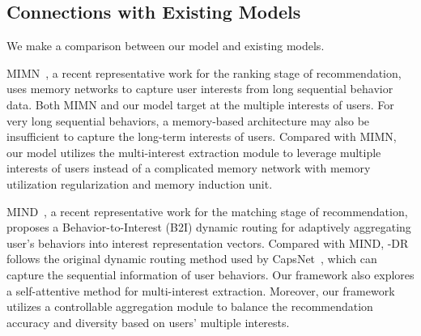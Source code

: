 \subsection{Connections with Existing Models}
We make a comparison between our model and existing models. 

MIMN~\cite{pi2019practice}, a recent representative work for the ranking stage of recommendation, uses memory networks to capture user interests from long sequential behavior data. Both MIMN and our model target at the multiple interests of users. For very long sequential behaviors, a memory-based architecture may also be insufficient to capture the long-term interests of users. Compared with MIMN, our model utilizes the multi-interest extraction module to leverage multiple interests of users instead of a complicated memory network with memory utilization regularization and memory induction unit. 

MIND~\cite{li2019multi}, a recent representative work for the matching stage of recommendation, proposes a Behavior-to-Interest (B2I) dynamic routing for adaptively aggregating user's behaviors into interest representation vectors. Compared with MIND, \model-DR follows the original dynamic routing method used by CapsNet~\cite{sabour2017dynamic}, which can capture the sequential information of user behaviors. Our framework also explores a self-attentive method for multi-interest extraction. Moreover, our framework utilizes a controllable aggregation module to balance the recommendation accuracy and diversity based on users' multiple interests. 

